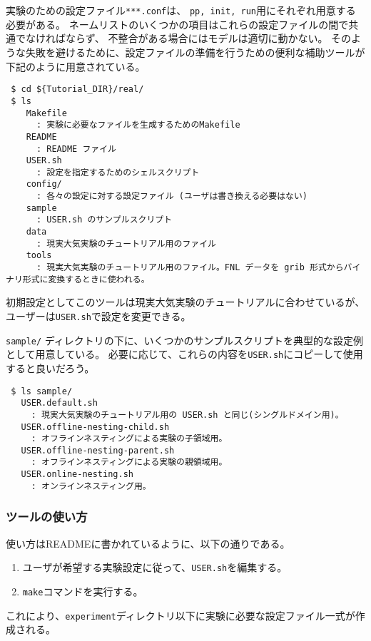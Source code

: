 \section{\SecMakeconfTool} \label{sec:basic_makeconf}

実験のための設定ファイル\verb|***.conf|は、
\verb|pp, init, run|用にそれぞれ用意する必要がある。
ネームリストのいくつかの項目はこれらの設定ファイルの間で共通でなければならず、
不整合がある場合にはモデルは適切に動かない。
そのような失敗を避けるために、設定ファイルの準備を行うための便利な補助ツールが
下記のように用意されている。
\begin{verbatim}
 $ cd ${Tutorial_DIR}/real/
 $ ls
    Makefile 
      : 実験に必要なファイルを生成するためのMakefile
    README   
      : README ファイル
    USER.sh  
      : 設定を指定するためのシェルスクリプト
    config/  
      : 各々の設定に対する設定ファイル (ユーザは書き換える必要はない)
    sample   
      : USER.sh のサンプルスクリプト
    data
      : 現実大気実験のチュートリアル用のファイル
    tools
      : 現実大気実験のチュートリアル用のファイル。FNL データを grib 形式からバイナリ形式に変換するときに使われる。
\end{verbatim}
初期設定としてこのツールは現実大気実験のチュートリアルに合わせているが、
ユーザーは\verb|USER.sh|で設定を変更できる。

\verb|sample/| ディレクトリの下に、いくつかのサンプルスクリプトを典型的な設定例として用意している。
必要に応じて、これらの内容を\verb|USER.sh|にコピーして使用すると良いだろう。
\begin{verbatim}
 $ ls sample/
   USER.default.sh                 
     : 現実大気実験のチュートリアル用の USER.sh と同じ(シングルドメイン用)。
   USER.offline-nesting-child.sh   
     : オフラインネスティングによる実験の子領域用。
   USER.offline-nesting-parent.sh  
     : オフラインネスティングによる実験の親領域用。
   USER.online-nesting.sh          
     : オンラインネスティング用。
\end{verbatim}


\subsubsection{ツールの使い方}

使い方はREADMEに書かれているように、以下の通りである。
\begin{enumerate}
  \item ユーザが希望する実験設定に従って、\verb|USER.sh|を編集する。
  \item \verb|make|コマンドを実行する。
\end{enumerate}
これにより、\verb|experiment|ディレクトリ以下に実験に必要な設定ファイル一式が作成される。

